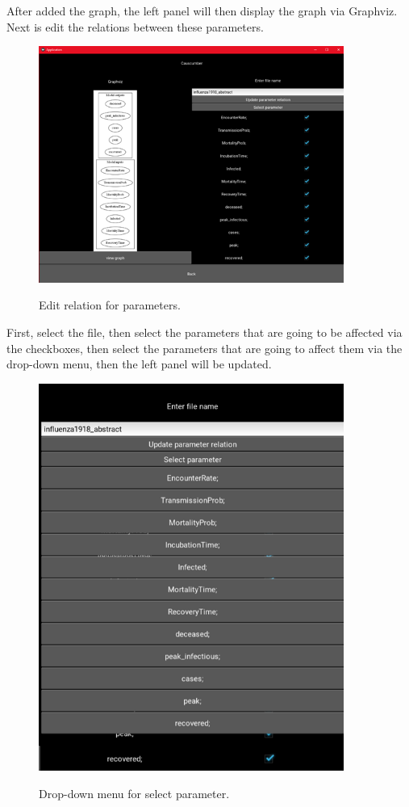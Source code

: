 After added the graph, the left panel will then display the graph via Graphviz. Next is edit the relations between these parameters.
\begin{figure}[H]
	\centering
	\includegraphics[width=10cm]{figures/influenzaTestProcess5.png}\\
	\caption{Edit relation for parameters.}
	\label{fig:figure23}
\end{figure}
First, select the file, then select the parameters that are going to be affected via the checkboxes, then select the parameters that are going to affect them via the drop-down menu, then the left panel will be updated.
\begin{figure}[H]
	\centering
	\includegraphics[width=10cm]{figures/influenzaTestProcess6.png}\\
	\caption{Drop-down menu for select parameter.}
	\label{fig:figure24}
\end{figure}
